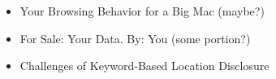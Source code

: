 
\begin{itemize}
  \item Your Browsing Behavior for a Big Mac (maybe?)
  \item For Sale: Your Data. By: You (some portion?)
  \item Challenges of Keyword-Based Location Disclosure
\end{itemize}
